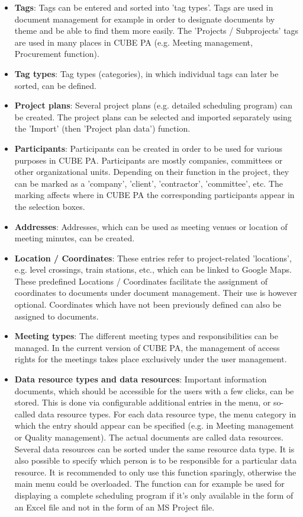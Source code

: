 \begin{itemize}
\item
\textbf{Tags}: Tags can be entered and sorted into 'tag types'. Tags are used in document management for example in order to designate documents by theme and be able to find them more easily. The 'Projects / Subprojects' tags are used in many places in CUBE PA (e.g. Meeting management, Procurement function).
\item
\textbf{Tag types}: Tag types (categories), in which individual tags can later be sorted, can be defined.
\item
\textbf{Project plans}: Several project plans (e.g. detailed scheduling program) can be created. The project plans can be selected and imported separately using the 'Import' (then 'Project plan data') function.
\item
\textbf{Participants}: Participants can be created in order to be used for various purposes in CUBE PA. Participants are mostly companies, committees or other organizational units. Depending on their function in the project, they can be marked as a 'company', 'client', 'contractor', 'committee', etc. The marking affects where in CUBE PA the corresponding participants appear in the selection boxes.
\item
\textbf{Addresses}: Addresses, which can be used as meeting venues or location of meeting minutes, can be created.
\item
\textbf{Location / Coordinates}: These entries refer to project-related 'locations', e.g. level crossings, train stations, etc., which can be linked to Google Maps. These predefined Locations / Coordinates facilitate the assignment of coordinates to documents under document management. Their use is however optional. Coordinates which have not been previously defined can also be assigned to documents.
\item
\textbf{Meeting types}: The different meeting types and responsibilities can be managed. In the current version of CUBE PA, the management of access rights for the meetings takes place exclusively under the user management.
\item
\textbf{Data resource types and data resources}: Important information documents, which should be accessible for the users with a few clicks, can be stored. This is done via configurable additional entries in the menu, or so-called data resource types. For each data resource type, the menu category in which the entry should appear can be specified (e.g. in Meeting management or Quality management). The actual documents are called data resources. Several data resources can be sorted under the same resource data type. It is also possible to specify which person is to be responsible for a particular data resource. It is recommended to only use this function sparingly, otherwise the main menu could be overloaded. The function can for example be used for displaying a complete scheduling program if it's only available in the form of an Excel file and not in the form of an MS Project file.

\end{itemize}
